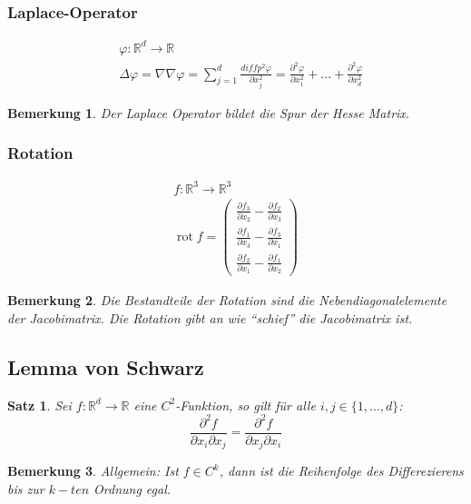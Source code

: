 \documentclass[12pt,a4paper]{report}%
\DeclareMathOperator{\rot}{rot}
\newtheorem{satz}{Satz}[section]
\newtheorem{bem}{Bemerkung}[section]
\numberwithin{equation}{section}
\newcommand{\R}{\mathbb{R}} %
\newcommand{\diffp}{\partial}
\newcommand{\laplace}{\Delta}
\def\dfp#1#2{\frac{\partial #1}{\partial #2}}
\numberwithin{equation}{subsection}
\begin{document}
  \subsubsection{Laplace-Operator}
  \begin{align}
    &\varphi: \R^d \rightarrow \R \nonumber \\
    &\laplace \varphi = \nabla \nabla \varphi= \sum\limits_{j=1}^d \frac{diffp^2 \varphi}{\diffp x_j^2} = \frac{\diffp^2 \varphi}{\diffp x_1^2} + ... + \frac{\diffp^2 \varphi}{\diffp x_d^2}
  \end{align}
  \begin{bem}
   Der Laplace Operator bildet die Spur der Hesse Matrix.
  \end{bem}
  
  \subsubsection{Rotation}
  \begin{align}
    f:\R^3 \rightarrow \R^3 \nonumber \\  
    \rot f = \left( \begin{array}{c}
    \displaystyle\dfp{f_3}{x_2} - \dfp{f_2}{x_3} \\
    \displaystyle\dfp{f_1}{x_3} - \dfp{f_3}{x_1} \\
    \displaystyle\dfp{f_2}{x_1} - \dfp{f_1}{x_2}
    \end{array} \right)
  \end{align}
  \begin{bem}
    Die Bestandteile der Rotation sind die Nebendiagonalelemente der Jacobimatrix. Die Rotation gibt an wie \enquote{schief} die Jacobimatrix ist.
  \end{bem}    

  
  \subsection{Lemma von Schwarz}
  \begin{satz}
    Sei $f: \R^d \rightarrow \R$ eine $C^2$-Funktion, so gilt für alle $i,j \in \lbrace 1, ..., d\rbrace$:
    \begin{equation}
      \frac{\diffp^2 f}{\diffp x_i \diffp x_j} = \frac{\diffp^2 f}{\diffp x_j \diffp x_i}
    \end{equation}
  \end{satz}
  \begin{bem}
    Allgemein: Ist $f \in C^k$, dann ist die Reihenfolge des Differezierens bis zur $k-ten$ Ordnung egal.
  \end{bem}
  
\end{document}

